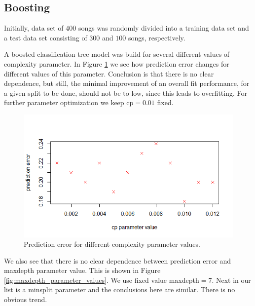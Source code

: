 \documentclass{article}
\begin{document}
\subsection{Boosting}

Initially, data set of $400$ songs was randomly divided into a training data set and a test data set consisting of $300$ and $100$ songs, respectively. 

A boosted classification tree model was build for several different values of complexity parameter. In Figure \ref{fig:complexity_parameter_values} we see how prediction error changes for different values of this parameter. Conclusion is that there is no clear dependence, but still, the minimal improvement of an overall fit performance, for a given split to be done, should not be to low, since this leads to overfitting. For further parameter optimization we keep {\selectfont cp$=0.01$} fixed.
 
 \begin{figure}[h] %
\includegraphics[scale=0.65]{figs/cp_values.png}
\centering
\caption{Prediction error for different complexity parameter values.} \label{fig:complexity_parameter_values}
\end{figure}
 
 We also see that there is no clear dependence between prediction error and {\selectfont maxdepth} parameter value. This is shown in Figure \ref{fig:maxdepth_parameter_values}. We use fixed value {\selectfont maxdepth$=7$}. Next in our list is a {\selectfont minsplit} parameter and the conclusions here are similar. There is no obvious trend.
 
\end{document}
